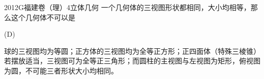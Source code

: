 
\begin{problem}{2012}{G}{福建卷（理）}{4}{立体几何}
一个几何体的三视图形状都相同，大小均相等，那么这个几何体不可以是
\begin{choices}
\end{choices}
\end{problem}

\begin{answer}
(D)
\end{answer}

\begin{solutions}
球的三视图均为等圆；正方体的三视图均为全等正方形；正四面体（特殊三棱锥）若摆放适当，三视图可为全等正三角形；而圆柱的主视图与左视图为矩形，俯视图为圆，不可能三者形状大小均相同。
\end{solutions}